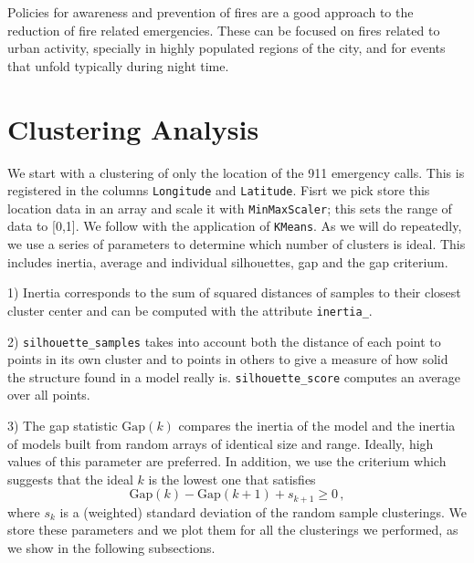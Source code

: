 \documentclass[12pt,a4paper]{article}
\begin{document}
Policies for awareness and prevention of fires are a good approach to the reduction of fire related emergencies. These can be focused on fires related to urban activity, specially in highly populated regions of the city, and for events that unfold typically during night time.


%



\appendix

\section{Clustering Analysis} \label{ClAn}

We start with a clustering of only the location of the 911 emergency calls. This is registered in the columns \verb|Longitude| and \verb|Latitude|. Fisrt we pick store this location data in an array and scale it with \verb|MinMaxScaler|; this sets the range of data to [0,1]. We follow with the application of \verb|KMeans|. As we will do repeatedly, we use a series of parameters to determine which number of clusters is ideal. This includes inertia, average and individual silhouettes, gap and the gap criterium.

1) Inertia corresponds to the sum of squared distances of samples to their closest cluster center and can be computed with the attribute \verb|inertia_|.

2) \verb|silhouette_samples| takes into account both the distance of each point to points in its own cluster and to points in others to give a measure of how solid the structure found in a model really is. \verb|silhouette_score| computes an average over all points.

3) The gap statistic $\mathrm{Gap}(k)$ compares the inertia of the model and the inertia of models built from random arrays of identical size and range. Ideally, high values of this parameter are preferred. In addition, we use the criterium which suggests that the ideal $k$ is the lowest one that satisfies \cite{Tibshirani}
\begin{equation}\label{eq_gap_crit}
\mathrm{Gap}(k) - \mathrm{Gap}(k+1) + s_{k+1} \geq 0 \, ,
\end{equation}
where $s_k$ is a (weighted) standard deviation of the random sample clusterings. We store these parameters and we plot them for all the clusterings we performed, as we show in the following subsections.
\end{document}
